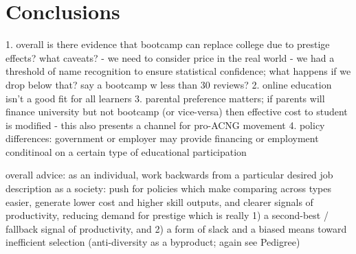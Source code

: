 \documentclass[review]{elsarticle}
\begin{document}
\section{Conclusions}

1. overall is there evidence that bootcamp can replace college due to prestige effects? what caveats?
- we need to consider price in the real world
- we had a threshold of name recognition to ensure statistical confidence; what happens if we drop below that? say a bootcamp w less than 30 reviews?
2. online education isn't a good fit for all learners
3. parental preference matters; if parents will finance university but not bootcamp (or vice-versa) then effective cost to student is modified
- this also presents a channel for pro-ACNG movement
4. policy differences: government or employer may provide financing or employment conditinoal on a certain type of educational participation

overall advice: as an individual, work backwards from a particular desired job description
as a society: push for policies which make comparing across types easier, generate lower cost and higher skill outputs,
and clearer signals of productivity, reducing demand for prestige which is really 1) a second-best / fallback signal of productivity,
and 2) a form of slack and a biased means toward inefficient selection (anti-diversity as a byproduct; again see Pedigree)


\end{document}
